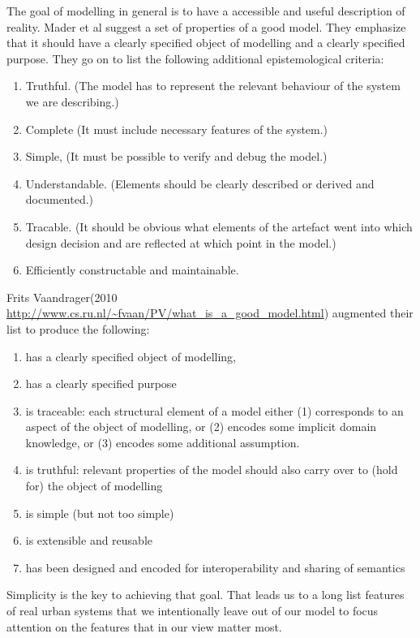 The goal of modelling in general is to  have a accessible and useful description of reality.  Mader et al \cite{maderConstructionVerificationModels2007} suggest a set of properties of a good model. They emphasize that it should have a clearly specified object of modelling and  a clearly specified purpose. They go on to list the  following additional epistemological criteria:
\begin{enumerate}   
\item  Truthful. (The model has to represent the relevant behaviour of the system we are describing.) 
\item  Complete (It must include necessary features of the system.)
\item Simple,  (It must be possible to verify and debug the model.)
\item Understandable. (Elements should be clearly described or derived and documented.)
\item  Tracable.  (It should be obvious what elements of the artefact went into which design decision and are reflected at which point in the model.)
\item  Efficiently constructable and maintainable. 
\end{enumerate}



Frits Vaandrager(2010 \url{http://www.cs.ru.nl/~fvaan/PV/what_is_a_good_model.html})   augmented their list to produce the following: \begin{enumerate}
     \item has a clearly specified object of modelling,
     \item  has a clearly specified purpose
     \item is traceable: each structural element of a model either (1) corresponds to an aspect of the object of modelling, or (2) encodes some implicit domain knowledge, or (3) encodes some additional assumption.
     \item  is truthful: relevant properties of the model should also carry over to (hold for) the object of modelling
     \item is simple (but not too simple)
     \item is extensible and reusable
     \item has been designed and encoded for interoperability and sharing of semantics
 \end{enumerate}


Simplicity is  the key to achieving that goal. That leads us to a long list  features of real urban systems that we intentionally leave out of  our model to focus attention on the features that in our view matter most. 

